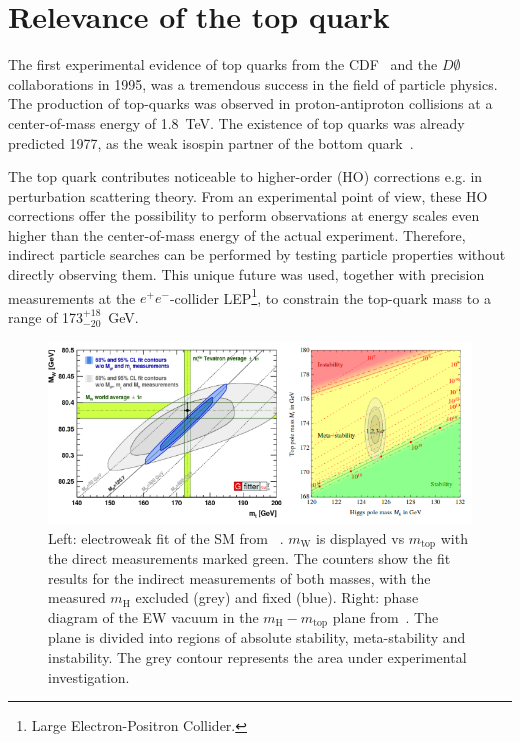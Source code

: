 \section{Relevance of the top quark}\label{Relevanz}

The first experimental evidence of top quarks from the CDF~\cite{Abe:1995hr} and the $D \emptyset$~\cite{Abachi:1995iq} collaborations in 1995, was a tremendous success in the field of particle physics. 
The production of top-quarks was observed in proton-antiproton collisions at a center-of-mass energy of 1.8~TeV. The existence of top quarks was already predicted 1977, as the weak isospin partner of the bottom quark~\cite{Herb:1977ek}. 

The top quark contributes noticeable to higher-order (HO) corrections e.g. in perturbation scattering theory.  From an experimental point of view, these HO corrections offer the possibility to perform observations at energy scales even higher than the center-of-mass energy of the actual experiment. Therefore, indirect particle searches can be performed by testing particle properties without directly observing them. This unique future was used, together with precision measurements at the $e^+e^-$-collider LEP\footnote{Large Electron-Positron Collider.}, to constrain the top-quark mass to a range of 173$^{+18}_{-20}$~GeV.~\cite{LEPEW:1994aa}
\begin{figure}[h]
	\centering
	\includegraphics[width=0.9\linewidth]{Pics/Relevanz}
	\caption{Left: electroweak fit of the SM from ~\cite{Baak:2012kk}. $m_{\text{W}}$ is displayed vs $m_{\text{top}}$ with the direct measurements marked green. The  counters show the fit results for the indirect measurements of both masses, with the measured $m_{\text{H}}$ excluded (grey) and fixed (blue).
		Right: phase diagram of the EW vacuum in the $m_{\text{H}}-m_{\text{top}}$ plane from~\cite{Buttazzo:2013uya}. The plane is divided into regions of absolute stability, meta-stability and instability. The grey contour represents the area under experimental investigation.}
	\label{fig:Relevanz}
\end{figure}

